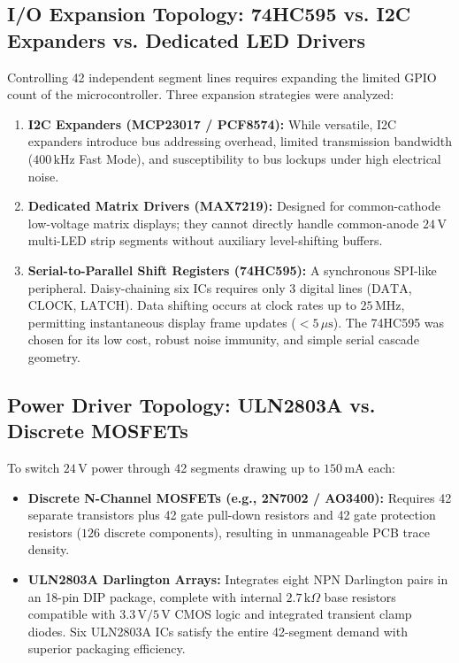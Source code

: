 \documentclass[12pt,a4paper,oneside]{report}
\begin{document}
\subsection{I/O Expansion Topology: 74HC595 vs. I2C Expanders vs. Dedicated LED Drivers}
Controlling 42 independent segment lines requires expanding the limited GPIO count of the microcontroller. Three expansion strategies were analyzed:
\begin{enumerate}
    \item \textbf{I2C Expanders (MCP23017 / PCF8574):} While versatile, I2C expanders introduce bus addressing overhead, limited transmission bandwidth ($400\,\text{kHz}$ Fast Mode), and susceptibility to bus lockups under high electrical noise.
    \item \textbf{Dedicated Matrix Drivers (MAX7219):} Designed for common-cathode low-voltage matrix displays; they cannot directly handle common-anode $24\,\text{V}$ multi-LED strip segments without auxiliary level-shifting buffers.
    \item \textbf{Serial-to-Parallel Shift Registers (74HC595):} A synchronous SPI-like peripheral. Daisy-chaining six ICs requires only 3 digital lines ($\text{DATA}$, $\text{CLOCK}$, $\text{LATCH}$). Data shifting occurs at clock rates up to $25\,\text{MHz}$, permitting instantaneous display frame updates ($< 5\,\mu\text{s}$). The 74HC595 was chosen for its low cost, robust noise immunity, and simple serial cascade geometry.
\end{enumerate}

\subsection{Power Driver Topology: ULN2803A vs. Discrete MOSFETs}
To switch $24\,\text{V}$ power through 42 segments drawing up to $150\,\text{mA}$ each:
\begin{itemize}
    \item \textbf{Discrete N-Channel MOSFETs (e.g., 2N7002 / AO3400):} Requires 42 separate transistors plus 42 gate pull-down resistors and 42 gate protection resistors ($126\text{ discrete components}$), resulting in unmanageable PCB trace density.
    \item \textbf{ULN2803A Darlington Arrays:} Integrates eight NPN Darlington pairs in an 18-pin DIP package, complete with internal $2.7\,\text{k}\Omega$ base resistors compatible with $3.3\,\text{V}/5\,\text{V}$ CMOS logic and integrated transient clamp diodes. Six ULN2803A ICs satisfy the entire 42-segment demand with superior packaging efficiency.
\end{itemize}
\end{document}
